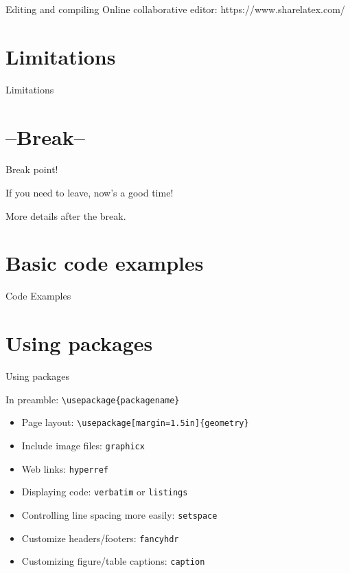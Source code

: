 \documentclass[xcolor={dvipsnames}]{beamer}
\begin{document}
\begin{frame}{Editing and compiling}
%
Online collaborative editor: https://www.sharelatex.com/
\end{frame}

\section{Limitations}
\begin{frame}{Limitations}
\end{frame}

\section{--Break--}
\begin{frame}{Break point!}
\begin{block}{}
\begin{center}
If you need to leave, now's a good time!

More details after the break.
\end{center}
\end{block}
\end{frame}

\section{Basic code examples}
\begin{frame}{Code Examples}
\end{frame}


\section{Using packages}
\begin{frame}{Using packages}
\begin{block}{}
\centering
In preamble: \texttt{\textbackslash usepackage\{packagename\}}
\end{block}
\begin{itemize}
\item Page layout: \texttt{\textbackslash usepackage[margin=1.5in]\{geometry\}}
\item Include image files: \texttt{graphicx}
\item Web links: \texttt{hyperref} 
\item Displaying code: \texttt{verbatim} or \texttt{listings}
\item Controlling line spacing more easily: \texttt{setspace}
\item Customize headers/footers: \texttt{fancyhdr}
\item Customizing figure/table captions: \texttt{caption}
\end{itemize}
\end{frame}
\end{document}
